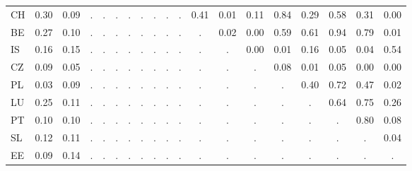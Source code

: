 {\begin{tabular}{l*{1}{cccccccccccccccccc}}
CH        &     0.30&     0.09&        .&        .&        .&        .&        .&        .&        .&        .&     0.41&     0.01&     0.11&     0.84&     0.29&     0.58&     0.31&     0.00\\
BE        &     0.27&     0.10&        .&        .&        .&        .&        .&        .&        .&        .&        .&     0.02&     0.00&     0.59&     0.61&     0.94&     0.79&     0.01\\
IS        &     0.16&     0.15&        .&        .&        .&        .&        .&        .&        .&        .&        .&        .&     0.00&     0.01&     0.16&     0.05&     0.04&     0.54\\
CZ        &     0.09&     0.05&        .&        .&        .&        .&        .&        .&        .&        .&        .&        .&        .&     0.08&     0.01&     0.05&     0.00&     0.00\\
PL        &     0.03&     0.09&        .&        .&        .&        .&        .&        .&        .&        .&        .&        .&        .&        .&     0.40&     0.72&     0.47&     0.02\\
LU        &     0.25&     0.11&        .&        .&        .&        .&        .&        .&        .&        .&        .&        .&        .&        .&        .&     0.64&     0.75&     0.26\\
PT        &     0.10&     0.10&        .&        .&        .&        .&        .&        .&        .&        .&        .&        .&        .&        .&        .&        .&     0.80&     0.08\\
SL        &     0.12&     0.11&        .&        .&        .&        .&        .&        .&        .&        .&        .&        .&        .&        .&        .&        .&        .&     0.04\\
EE        &     0.09&     0.14&        .&        .&        .&        .&        .&        .&        .&        .&        .&        .&        .&        .&        .&        .&        .&        .\\
\hline\hline
\end{tabular}
}
